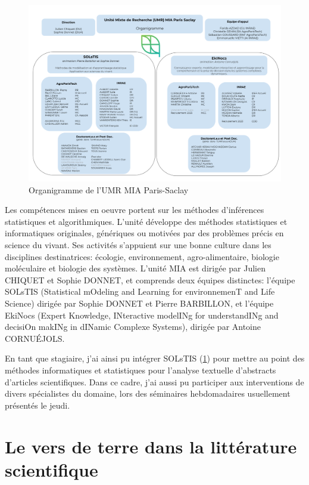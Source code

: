 \documentclass{book}
\begin{document}
\begin{figure}[htb] %
    \begin{center} %
        \includegraphics[width=12cm]{organigrammeEquipe.png}
        \caption{Organigramme de l'UMR MIA Paris-Saclay}\label{fig_organigrame}
    \end{center}
\end{figure}
Les compétences mises en oeuvre portent sur les méthodes d'inférences statistiques et algorithmiques. L'unité développe des méthodes statistiques et informatiques originales, \sloppy génériques ou motivées par des problèmes précis en science du vivant. Ses activités s'appuient sur une bonne culture dans les disciplines destinatrices: écologie, environnement, agro-alimentaire, biologie moléculaire et biologie des systèmes.
L'unité MIA est dirigée par Julien CHIQUET et Sophie
DONNET, et comprends deux équipes distinctes: l'équipe SOLsTIS (Statistical
mOdeling and Learning for environnemenT and Life Science) dirigée par Sophie
DONNET et Pierre BARBILLON, et l'équipe EkiNocs (Expert Knowledge, INteractive
modelINg for understandINg and decisiOn makINg in dINamic Complexe Systems),
dirigée par Antoine CORNU\'{E}JOLS.

En tant que stagiaire, j'ai ainsi pu intégrer SOLsTIS (\cref{fig_organigrame}) pour mettre au point des
méthodes informatiques et statistiques pour l'analyse textuelle d'abstracts
d'articles scientifiques. Dans ce cadre, j'ai aussi pu participer aux interventions de divers spécialistes du domaine, lors des séminaires hebdomadaires usuellement présentés le jeudi.

\thispagestyle{fancy}

\section{Le vers de terre dans la littérature scientifique}
\end{document}
